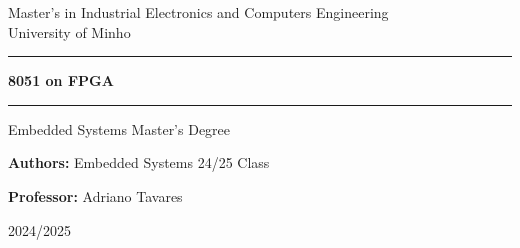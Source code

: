 \centering
\begin{figure}[h!]  %
    \centering
    \label{fig:UM logo}
    \hspace{0.1cm}
    \label{fig:CMEMS logo}
    

\end{figure}
\vspace{0.25in}
\large
Master’s in Industrial Electronics and Computers Engineering \\
\vspace{0.15in}
\LARGE
University of Minho\\
\vspace{0.35in}
\hrule

\vspace{0.2in}
\textbf{8051 on FPGA}
\vspace{0.2in}

\hrule
\vspace{0.2in}
\large
Embedded Systems Master's Degree
\vspace{4in}

\textbf{Authors:}
Embedded Systems 24/25 Class
\vspace{0.1in}

\textbf{Professor:}
Adriano Tavares

\vfill

2024/2025